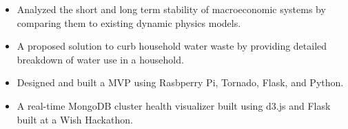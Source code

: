 \documentclass[10pt,a4paper,academicons]{altacv}
\begin{document}
\begin{itemize}
\item Analyzed the short and long term stability of macroeconomic systems by
    comparing them to existing dynamic physics models.
\end{itemize}


\begin{itemize}
\item A proposed solution to curb household water waste by providing detailed breakdown of water use in a household.
\item Designed and built a MVP using Rasbperry Pi, Tornado, Flask, and Python.
\end{itemize}
\divider

\begin{itemize}
\item A real-time MongoDB cluster health visualizer built using d3.js and Flask
    built at a Wish Hackathon.
\end{itemize}
\end{document}
